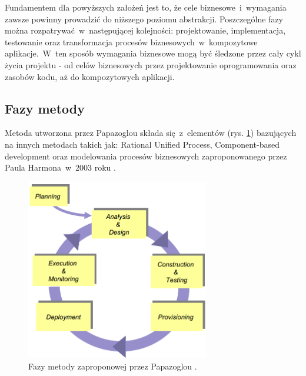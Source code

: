 Fundamentem dla powyższych założeń jest to, że cele biznesowe~i~wymagania zawsze powinny prowadzić do niższego poziomu abstrakcji. Poszczególne fazy można rozpatrywać~w~następującej kolejności: projektowanie, implementacja, testowanie oraz transformacja procesów biznesowych~w~kompozytowe aplikacje.~W~ten sposób wymagania biznesowe mogą być śledzone przez cały cykl życia projektu - od celów biznesowych przez projektowanie oprogramowania oraz zasobów kodu, aż do kompozytowych aplikacji.

\subsection{Fazy metody}
Metoda utworzona przez Papazoglou składa się~z~elementów (rys. \ref{papazoglou_method_phases}) bazujących na innych metodach takich jak: Rational Unified Process, Component-based development oraz modelowania procesów biznesowych zaproponowanego przez Paula Harmona~w~2003 roku \cite{PapaZog}. 

\begin{figure}[h!tbp]
\begin{centering}
\includegraphics[width=8cm]{img/papazoglou_metoda_fazy.png}
\caption[Fazy metody zaproponowej przez Papazoglou.]{Fazy metody zaproponowej przez Papazoglou \cite{PapaZog}.}\label{papazoglou_method_phases}
\end{centering}
\end{figure} 

